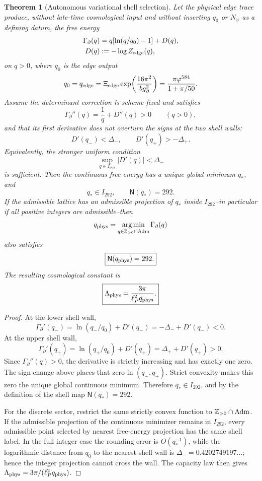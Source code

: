 \documentclass[aps,prd,reprint,nofootinbib,superscriptaddress,floatfix]{revtex4-2}
\numberwithin{equation}{section}
\theoremstyle{definition}
\theoremstyle{plain}
\newtheorem{theorem}{Theorem}[section]
\begin{document}
\begin{theorem}[Autonomous variational shell selection]
\label{thm:edge-selector-conditional}
Let the physical edge trace produce, without late-time cosmological input and
without inserting \(q_0\) or \(N_\varphi\) as a defining datum, the free energy
\[
\begin{aligned}
\Gamma_\partial(q)
&=
q[\ln(q/q_0)-1]+D(q),\\
D(q)&:=-\log Z_{\rm edge}(q),
\end{aligned}
\]
on \(q>0\), where \(q_0\) is the edge output
\[
q_0=q_{\rm edge}
=
\Xi_{\rm edge}\exp\!\left(\frac{16\pi^2}{b g_\partial^2}\right)
=
\frac{\pi\varphi^{584}}{1+\pi/50}.
\]
Assume the determinant correction is scheme-fixed and satisfies
\[
\Gamma_\partial''(q)=\frac1q+D''(q)>0
\qquad(q>0),
\]
and that its first derivative does not overturn the signs at the two shell
walls:
\[
D'(q_-)<\Delta_-,
\qquad
D'(q_+)>-\Delta_+ .
\]
Equivalently, the stronger uniform condition
\[
\sup_{q\in I_{292}}|D'(q)|<\Delta_-
\]
is sufficient.  Then the continuous free energy has a unique global minimum
\(q_\ast\), and
\[
q_\ast\in I_{292},
\qquad
\mathsf N(q_\ast)=292.
\]
If the admissible lattice has an admissible projection of \(q_\ast\) inside
\(I_{292}\)--in particular if all positive integers are admissible--then
\[
q_{\rm phys}
=
\operatorname*{arg\,min}_{q\in\mathbb Z_{>0}\cap{\rm Adm}}
\Gamma_\partial(q)
\]
also satisfies
\[
\boxed{\mathsf N(q_{\rm phys})=292.}
\]
The resulting cosmological constant is
\[
\boxed{
\Lambda_{\rm phys}
=
\frac{3\pi}{\ell_P^2q_{\rm phys}}.
}
\]
\end{theorem}

\begin{proof}
At the lower shell wall,
\[
\Gamma_\partial'(q_-)
=
\ln(q_-/q_0)+D'(q_-)
=
-\Delta_-+D'(q_-)
<0.
\]
At the upper shell wall,
\[
\Gamma_\partial'(q_+)
=
\ln(q_+/q_0)+D'(q_+)
=
\Delta_+ +D'(q_+)
>0.
\]
Since \(\Gamma_\partial''(q)>0\), the derivative is strictly increasing and
has exactly one zero.  The sign change above places that zero in
\((q_-,q_+)\).  Strict convexity makes this zero the unique global continuous
minimum.  Therefore \(q_\ast\in I_{292}\), and by the definition of the shell
map \(\mathsf N(q_\ast)=292\).

For the discrete sector, restrict the same strictly convex function to
\(\mathbb Z_{>0}\cap{\rm Adm}\).  If the admissible projection of the
continuous minimizer remains in \(I_{292}\), every admissible point selected by
nearest free-energy projection has the same shell label.  In the full integer
case the rounding error is \(O(q_\ast^{-1})\), while the logarithmic distance
from \(q_0\) to the nearest shell wall is \(\Delta_-=0.4202749197\ldots\);
hence the integer projection cannot cross the wall.  The capacity law then
gives \(\Lambda_{\rm phys}=3\pi/(\ell_P^2q_{\rm phys})\).
\end{proof}
\end{document}
